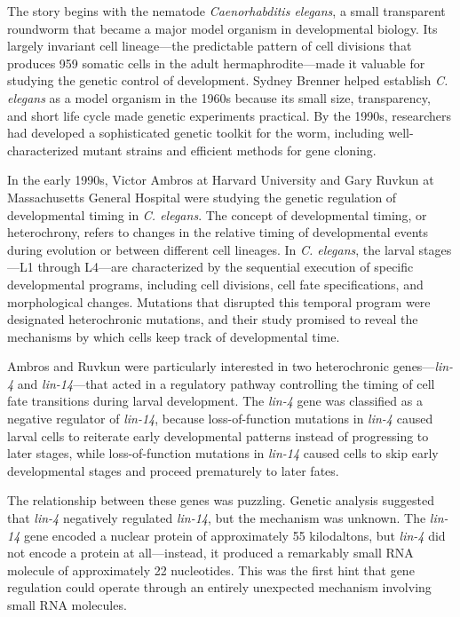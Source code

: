 The story begins with the nematode \textit{Caenorhabditis elegans}, a small transparent roundworm that became a major model organism in developmental biology. Its largely invariant cell lineage---the predictable pattern of cell divisions that produces 959 somatic cells in the adult hermaphrodite---made it valuable for studying the genetic control of development. Sydney Brenner helped establish \textit{C. elegans} as a model organism in the 1960s because its small size, transparency, and short life cycle made genetic experiments practical. By the 1990s, researchers had developed a sophisticated genetic toolkit for the worm, including well-characterized mutant strains and efficient methods for gene cloning.

In the early 1990s, Victor Ambros at Harvard University and Gary Ruvkun at Massachusetts General Hospital were studying the genetic regulation of developmental timing in \textit{C. elegans}. The concept of developmental timing, or heterochrony, refers to changes in the relative timing of developmental events during evolution or between different cell lineages. In \textit{C. elegans}, the larval stages---L1 through L4---are characterized by the sequential execution of specific developmental programs, including cell divisions, cell fate specifications, and morphological changes. Mutations that disrupted this temporal program were designated heterochronic mutations, and their study promised to reveal the mechanisms by which cells keep track of developmental time.

Ambros and Ruvkun were particularly interested in two heterochronic genes---\textit{lin-4} and \textit{lin-14}---that acted in a regulatory pathway controlling the timing of cell fate transitions during larval development. The \textit{lin-4} gene was classified as a negative regulator of \textit{lin-14}, because loss-of-function mutations in \textit{lin-4} caused larval cells to reiterate early developmental patterns instead of progressing to later stages, while loss-of-function mutations in \textit{lin-14} caused cells to skip early developmental stages and proceed prematurely to later fates.

The relationship between these genes was puzzling. Genetic analysis suggested that \textit{lin-4} negatively regulated \textit{lin-14}, but the mechanism was unknown. The \textit{lin-14} gene encoded a nuclear protein of approximately 55 kilodaltons, but \textit{lin-4} did not encode a protein at all---instead, it produced a remarkably small RNA molecule of approximately 22 nucleotides. This was the first hint that gene regulation could operate through an entirely unexpected mechanism involving small RNA molecules.

